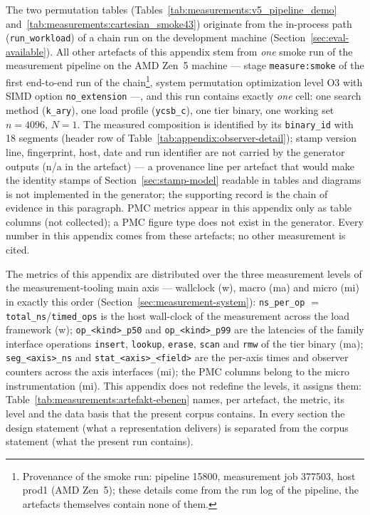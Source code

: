 The two permutation tables (Tables~\ref{tab:measurements:v5_pipeline_demo}
and~\ref{tab:measurements:cartesian_smoke43}) originate from the in-process path
(\texttt{run\_workload}) of a chain run on the development machine
(Section~\ref{sec:eval-available}). All other artefacts of this appendix stem from \emph{one} smoke
run of the measurement pipeline on the AMD Zen~5 machine --- stage \texttt{measure:smoke} of the
first end-to-end run of the chain\footnote{Provenance of the smoke run: pipeline 15800, measurement
job 377503, host prod1 (AMD Zen~5); these details come from the run log of the pipeline, the
artefacts themselves contain none of them.}, system permutation optimization level O3 with SIMD
option \texttt{no\_extension} ---, and this run contains exactly \emph{one} cell: one search method
(\texttt{k\_ary}), one load profile (\texttt{ycsb\_c}), one tier binary, one working set $n = 4096$,
$N = 1$. The measured composition is identified by its \texttt{binary\_id} with 18 segments (header
row of Table~\ref{tab:appendix:observer-detail}); stamp version line, fingerprint, host, date and
run identifier are not carried by the generator outputs (n/a in the artefact) --- a provenance line
per artefact that would make the identity stamps of Section~\ref{sec:stamp-model} readable in
tables and diagrams is not implemented in the generator; the supporting record is the chain of
evidence in this paragraph. PMC metrics appear in this appendix only as table columns (not
collected); a PMC figure type does not exist in the generator. Every number in this appendix comes
from these artefacts; no other measurement is cited.

The metrics of this appendix are distributed over the three measurement levels of the
measurement-tooling main axis --- wallclock (w), macro (ma) and micro (mi) in exactly this order
(Section~\ref{sec:measurement-system}): \texttt{ns\_per\_op} $=$
\texttt{total\_ns}/\texttt{timed\_ops} is the host wall-clock of the measurement across the load
framework (w); \texttt{op\_<kind>\_p50} and \texttt{op\_<kind>\_p99} are the latencies of the family
interface operations \texttt{insert}, \texttt{lookup}, \texttt{erase}, \texttt{scan} and
\texttt{rmw} of the tier binary (ma); \texttt{seg\_<axis>\_ns} and \texttt{stat\_<axis>\_<field>}
are the per-axis times and observer counters across the axis interfaces (mi); the PMC columns
belong to the micro instrumentation (mi). This appendix does not redefine the levels, it assigns
them: Table~\ref{tab:measurements:artefakt-ebenen} names, per artefact, the metric, its level and
the data basis that the present corpus contains. In every section the design statement (what a
representation delivers) is separated from the corpus statement (what the present run contains).

